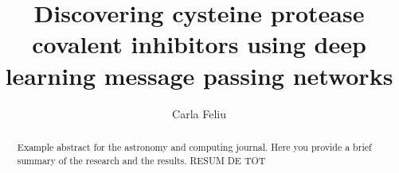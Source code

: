 \documentclass[final,times,twocolumn,article]{elsarticle}
\begin{document}
\begin{frontmatter}



\title{Discovering cysteine protease covalent inhibitors using deep learning message passing networks}


\author[first]{Carla Feliu}

\begin{abstract}
Example abstract for the astronomy and computing journal. Here you provide a brief summary of the research and the results. RESUM DE TOT
\end{abstract}




\end{frontmatter}
\end{document}
